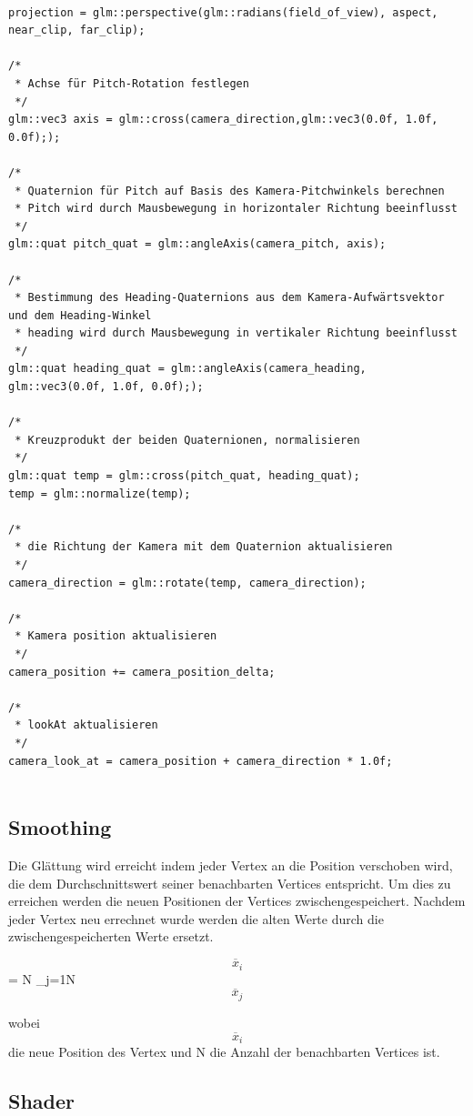 	
\begin{lstlisting}

projection = glm::perspective(glm::radians(field_of_view), aspect, near_clip, far_clip);

/*
 * Achse für Pitch-Rotation festlegen
 */
glm::vec3 axis = glm::cross(camera_direction,glm::vec3(0.0f, 1.0f, 0.0f););

/*
 * Quaternion für Pitch auf Basis des Kamera-Pitchwinkels berechnen
 * Pitch wird durch Mausbewegung in horizontaler Richtung beeinflusst
 */
glm::quat pitch_quat = glm::angleAxis(camera_pitch, axis);

/*
 * Bestimmung des Heading-Quaternions aus dem Kamera-Aufwärtsvektor und dem Heading-Winkel
 * heading wird durch Mausbewegung in vertikaler Richtung beeinflusst
 */
glm::quat heading_quat = glm::angleAxis(camera_heading, glm::vec3(0.0f, 1.0f, 0.0f););

/*
 * Kreuzprodukt der beiden Quaternionen, normalisieren
 */
glm::quat temp = glm::cross(pitch_quat, heading_quat);
temp = glm::normalize(temp);

/*
 * die Richtung der Kamera mit dem Quaternion aktualisieren
 */
camera_direction = glm::rotate(temp, camera_direction);

/*
 * Kamera position aktualisieren
 */
camera_position += camera_position_delta;

/*
 * lookAt aktualisieren
 */
camera_look_at = camera_position + camera_direction * 1.0f;


\end{lstlisting}

\subsection{Smoothing}

Die Glättung wird erreicht indem jeder Vertex an die Position verschoben wird, die dem Durchschnittswert seiner benachbarten Vertices entspricht. Um dies zu erreichen werden die neuen Positionen der Vertices zwischengespeichert. Nachdem jeder Vertex neu errechnet wurde werden die alten Werte durch die zwischengespeicherten Werte ersetzt.

    \[\overline{x}_i\] = N \sum_{j=1}{N}{\[\overline{x}_j\]}
    
    wobei \[\overline{x}_i\] die neue Position des Vertex und N die Anzahl der benachbarten Vertices ist.


	
	\subsection{Shader}
	
